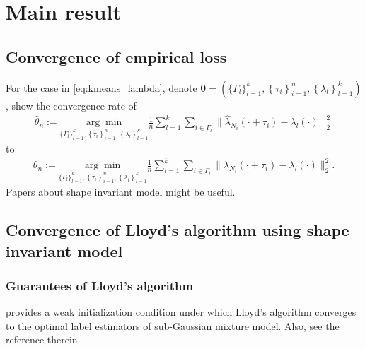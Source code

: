 

\section{Main result}




	\subsection{Convergence of empirical loss}
		For the case in \eqref{eq:kmeans_lambda}, denote $\mathbf{\theta}=\left( \{\Gamma_l\}_{l=1}^k, \left\{ \tau_i \right\}_{i=1}^n, \left\{ \lambda_l \right\}_{l=1}^k \right)$, show the convergence rate of
			\begin{align*}
			\hat\theta_n := 
			\underset{\{\Gamma_l\}_{l=1}^k, \left\{ \tau_i \right\}_{i=1}^n, \left\{ \lambda_l \right\}_{l=1}^k}{\arg\min}
			\frac{1}{n} \sum_{l=1}^k \sum_{i\in\Gamma_l} \|\hat\lambda_{N_i}(\cdot+\tau_i)- \lambda_l(\cdot)\|_2^2 
			\end{align*}
		to 
			\begin{align*}
				\theta_n := 
				\underset{\{\Gamma_l\}_{l=1}^k, \left\{ \tau_i \right\}_{i=1}^n, \left\{ \lambda_l \right\}_{l=1}^k}{\arg\min}
				\frac{1}{n} \sum_{l=1}^k \sum_{i\in\Gamma_l} \|\lambda_{N_i}(\cdot+\tau_i)- \lambda_l(\cdot)\|_2^2.
			\end{align*}
		Papers about shape invariant model might be useful. 
		
		
		
		
		
		




	\subsection{Convergence of Lloyd's algorithm using shape invariant model}
		\subsubsection*{Guarantees of Lloyd's algorithm}
			\citet{Lu} provides a weak initialization condition under which Lloyd's algorithm converges to the optimal label estimators of sub-Gaussian mixture model.
			Also, see the reference therein.

